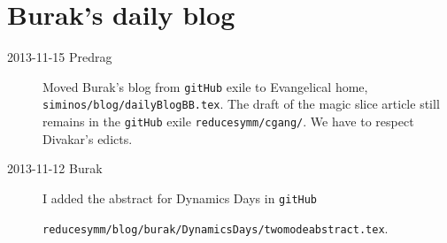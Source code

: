 

\chapter{Burak's daily blog}
\label{c-dailyBlogBB}

\begin{description}

\item[2013-11-15  Predrag] Moved Burak's blog from \texttt{gitHub} exile 
to Evangelical home, \texttt{siminos/blog/dailyBlogBB.tex}.
The draft of the magic slice article still remains in the 
 \texttt{gitHub} exile \texttt{reducesymm/cgang/}. We have to respect Divakar's edicts.


\item[2013-11-12  Burak]
I added the abstract for Dynamics Days in \texttt{gitHub}

\texttt{reducesymm/blog/burak/DynamicsDays/twomodeabstract.tex}.


\end{description}
